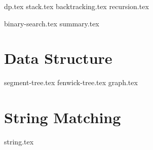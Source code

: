 \documentclass{../latex-setting/cmemoir}
\begin{document}

\frontmatter

\tableofcontents

\restoregeometry%

\mainmatter{}


{dp.tex}
{stack.tex}
{backtracking.tex}
{recursion.tex}

{binary-search.tex}
{summary.tex}



\part{Data Structure}
{segment-tree.tex} %
{fenwick-tree.tex}
{graph.tex}



\part{String Matching}
{string.tex}
% 
\end{document}
